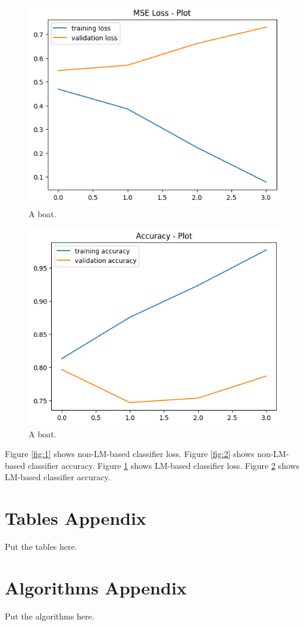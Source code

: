 \documentclass[11pt]{article}
\begin{document}
	\begin{figure}
		\includegraphics[width=\linewidth]{loss-yes-transformer.png}
		\caption{A boat.}
		\label{fig:3}
	\end{figure}
	
	\begin{figure}
		\includegraphics[width=\linewidth]{accuracy-yes-transformer.png}
		\caption{A boat.}
		\label{fig:4}
	\end{figure}
	
	Figure \ref{fig:1} shows non-LM-based classifier loss.
	Figure \ref{fig:2} shows non-LM-based classifier accuracy.
	Figure \ref{fig:3} shows LM-based classifier loss.
	Figure \ref{fig:4} shows LM-based classifier accuracy.
	
	\section{Tables  Appendix}
	\label{sec:appendix}
	
	Put the tables here.
	
	\section{Algorithms  Appendix}
	\label{sec:appendix}
	
	Put the algorithms here.
\end{document}
